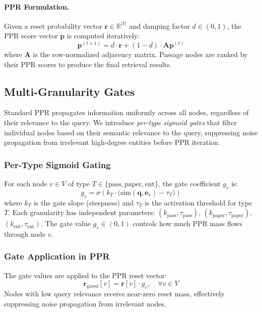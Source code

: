 \documentclass[conference,a4paper]{IEEEtran}
\newcommand{\bm}[1]{\boldsymbol{#1}}
\newcommand{\sigm}{\sigma}
\begin{document}
\paragraph{PPR Formulation.}
Given a reset probability vector $\bm{r} \in \mathbb{R}^{|V|}$ and damping factor $d \in (0,1)$, the PPR score vector $\bm{p}$ is computed iteratively:
\begin{equation}
    \bm{p}^{(t+1)} = d \cdot \bm{r} + (1 - d) \cdot \mathbf{A} \bm{p}^{(t)}
    \label{eq:ppr}
\end{equation}
where $\mathbf{A}$ is the row-normalized adjacency matrix. Passage nodes are ranked by their PPR scores to produce the final retrieval results.

\subsection{Multi-Granularity Gates}\label{sec:mgg}

Standard PPR propagates information uniformly across all nodes, regardless of their relevance to the query. We introduce \textit{per-type sigmoid gates} that filter individual nodes based on their semantic relevance to the query, suppressing noise propagation from irrelevant high-degree entities before PPR iteration.

\subsubsection{Per-Type Sigmoid Gating}
For each node $v \in V$ of type $T \in \{\text{pass}, \text{paper}, \text{ent}\}$, the gate coefficient $g_v$ is:
\begin{equation}
    g_v = \sigm\!\left(k_T \cdot \big(\text{sim}(\bm{q}, \bm{e}_v) - \tau_T\big)\right)
    \label{eq:gate}
\end{equation}
where $k_T$ is the gate slope (steepness) and $\tau_T$ is the activation threshold for type $T$. Each granularity has independent parameters: $(k_{\text{pass}}, \tau_{\text{pass}})$, $(k_{\text{paper}}, \tau_{\text{paper}})$, $(k_{\text{ent}}, \tau_{\text{ent}})$. The gate value $g_v \in (0, 1)$ controls how much PPR mass flows through node $v$.

\subsubsection{Gate Application in PPR}
The gate values are applied to the PPR reset vector:
\begin{equation}
    \bm{r}_{\text{gated}}[v] = \bm{r}[v] \cdot g_v, \quad \forall v \in V
    \label{eq:gated_reset}
\end{equation}
Nodes with low query relevance receive near-zero reset mass, effectively suppressing noise propagation from irrelevant nodes.
\end{document}
